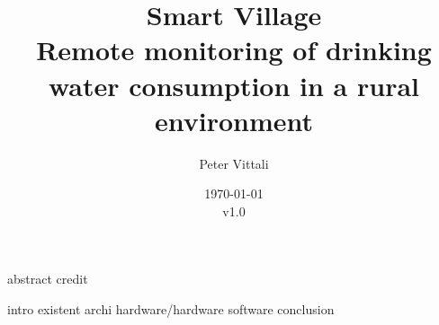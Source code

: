 \documentclass[english, twoside]{report}
\title{Smart Village\\
{\Large Remote monitoring of drinking water consumption in a rural environment}
}
\author{Peter Vittali}
\date{\today\\v1.0}
\begin{document}
\maketitle

 {abstract}
 {credit}

\tableofcontents
\listoffigures

 {intro}
 {existent}
 {archi}
 {hardware/hardware}
 {software}
 {conclusion}


\printbibliography
\end{document}
